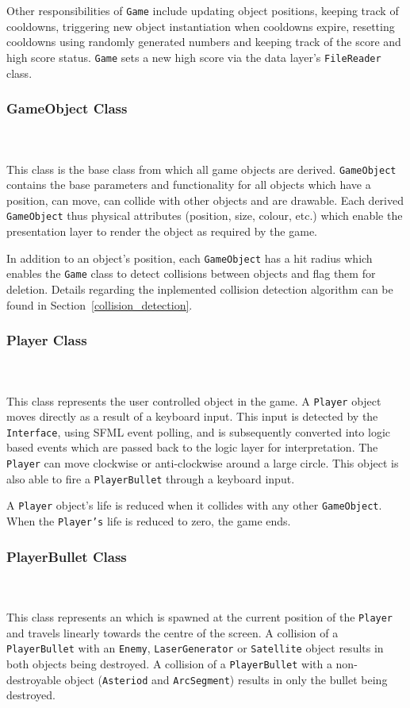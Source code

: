 \documentclass[10pt,twocolumn]{witseiepaper}
\begin{document}
Other responsibilities of \texttt{Game} include updating object positions, keeping track of cooldowns, triggering new object instantiation when cooldowns expire, resetting cooldowns using randomly generated numbers and keeping track of the score and high score status. \texttt{Game} sets a new high score via the data layer's \texttt{FileReader} class. 


\subsubsection{GameObject Class}
~\\
~\\
 This class is the base class from which all game objects are derived. \texttt{GameObject} contains the base parameters and functionality for all objects which have a position, can move, can collide with other objects and are drawable. Each derived \texttt{GameObject} thus physical attributes (position, size, colour, etc.) which enable the presentation layer to render the object as required by the game.
 
 In addition to an object's position, each \texttt{GameObject} has a hit radius which enables the \texttt{Game} class to detect collisions between objects and flag them for deletion. Details regarding the inplemented collision detection algorithm can be found in Section~\ref{collision_detection}.
 
\subsubsection{Player Class}
~\\
~\\
This class represents the user controlled object in the game. A \texttt{Player} object moves directly as a result of a keyboard input. This input is detected by the \texttt{Interface}, using SFML event polling, and is  subsequently converted into logic based events which are passed back to the logic layer for interpretation. The \texttt{Player} can move clockwise or anti-clockwise around a large circle. This object is also able to fire a \texttt{PlayerBullet} through a keyboard input. 

A \texttt{Player} object's life is reduced when it collides with any other \texttt{GameObject}. When the \texttt{Player's} life is reduced to zero, the game ends.

\subsubsection{PlayerBullet Class}
~\\
~\\
This class represents an which is spawned at the current position of the \texttt{Player} and travels linearly towards the centre of the screen. A collision of a \texttt{PlayerBullet} with an \texttt{Enemy}, \texttt{LaserGenerator} or \texttt{Satellite} object results in both objects being destroyed. A collision of a \texttt{PlayerBullet} with a non-destroyable object (\texttt{Asteriod} and \texttt{ArcSegment}) results in only the bullet being destroyed.
\end{document}
